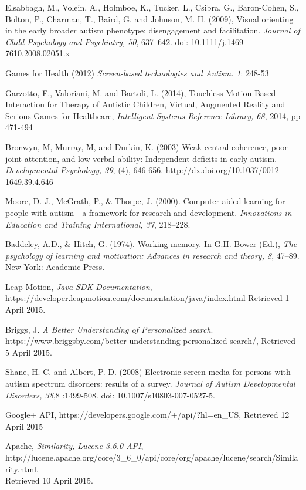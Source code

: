 \documentclass[a4paper, 11pt]{article}
\begin{document}
\begin{thebibliography}{100}
Elsabbagh, M., Volein, A., Holmboe, K., Tucker, L., Csibra, G., Baron-Cohen, S., Bolton, P., Charman, T., Baird, G. and Johnson, M. H. (2009), Visual orienting in the early broader autism phenotype: disengagement and facilitation. \textit{Journal of Child Psychology and Psychiatry, 50}, 637–642. doi: 10.1111/j.1469-7610.2008.02051.x

 Games for Health (2012) \textit{Screen-based technologies and Autism. 1}: 248-53

 Garzotto, F., Valoriani, M. and Bartoli, L. (2014), Touchless Motion-Based Interaction for Therapy of Autistic Children, Virtual, Augmented Reality and Serious Games for Healthcare, \textit{Intelligent Systems Reference Library, 68}, 2014, pp 471-494

 Bronwyn, M, Murray, M, and Durkin, K. (2003) Weak central coherence, poor joint attention, and low verbal ability: Independent deficits in early autism. \textit{Developmental Psychology, 39}, (4), 646-656. http://dx.doi.org/10.1037/0012-1649.39.4.646

Moore, D. J., McGrath, P., \& Thorpe, J. (2000). Computer aided learning for people with autism—a framework for research and development. \textit{Innovations in Education and Training International, 37}, 218–228.

Baddeley, A.D., \& Hitch, G. (1974). Working memory. In G.H. Bower (Ed.), \textit{The psychology of learning and motivation: Advances in research and theory, 8}, 47–89. New York: Academic Press.

 Leap Motion, \textit{Java SDK Documentation}, \\https://developer.leapmotion.com/documentation/java/index.html Retrieved 1 April 2015.

Briggs, J. \textit{A Better Understanding of Personalized search}. https://www.briggsby.com/better-understanding-personalized-search/, Retrieved 5 April 2015.

Shane, H. C. and Albert, P. D. (2008) Electronic screen media for persons with autism spectrum disorders: results of a survey. \textit{Journal of Autism Developmental Disorders, 38},8 :1499-508. doi: 10.1007/s10803-007-0527-5.

 Google+ API, https://developers.google.com/+/api/?hl=en\_US, Retrieved 12 April 2015

 Apache, \textit{Similarity, Lucene 3.6.0 API},  \\http://lucene.apache.org/core/3\_6\_0/api/core/org/apache/lucene/search/Similarity.html, \\Retrieved 10 April 2015.


\end{thebibliography}
\end{document}
